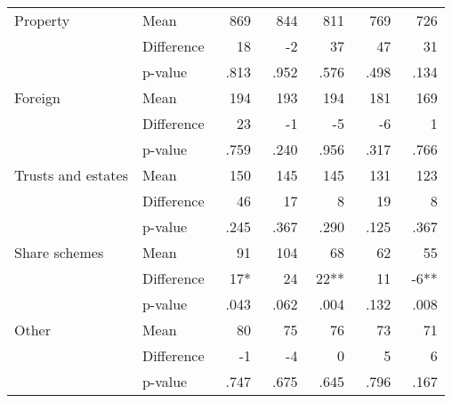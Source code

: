 {\begin{tabular}{llrrrrr}
  Property               & Mean       & 869      & 844      & 811      & 769      & 726      \\
                         & Difference & 18       & -2       & 37       & 47       & 31       \\
                         & p-value    & ~.813    & ~.952    & ~.576    & ~.498    & ~.134    \\
  Foreign                & Mean       & 194      & 193      & 194      & 181      & 169      \\
                         & Difference & 23       & -1       & -5       & -6       & 1        \\
                         & p-value    & ~.759    & ~.240    & ~.956    & ~.317    & ~.766    \\
  Trusts and estates     & Mean       & 150      & 145      & 145      & 131      & 123      \\
                         & Difference & 46       & 17       & 8        & 19       & 8        \\
                         & p-value    & ~.245    & ~.367    & ~.290    & ~.125    & ~.367    \\
  Share schemes          & Mean       & 91       & 104      & 68       & 62       & 55       \\
                         & Difference & 17*      & 24       & 22**     & 11       & -6**     \\
                         & p-value    & ~.043    & ~.062    & ~.004    & ~.132    & ~.008    \\
  Other                  & Mean       & 80       & 75       & 76       & 73       & 71       \\
                         & Difference & -1       & -4       & 0        & 5        & 6        \\
                         & p-value    & ~.747    & ~.675    & ~.645    & ~.796    & ~.167    \\  
  \bottomrule
\end{tabular}
}

